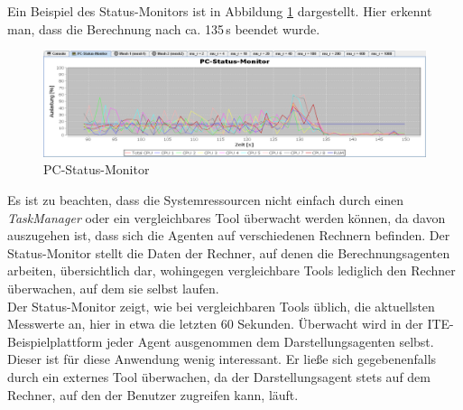 \documentclass[a4paper,12pt,oneside,openright,onecolumn,final,titlepage,fleqn,ngerman]{scrreprt}
\newcommand{\parag}{\\[2ex]}
\newcommand{\calcag}{Berechnungsagent}
\newcommand{\repag}{Darstellungsagent}
\begin{document}
	Ein Beispiel des Status-Monitors ist in Abbildung \ref{ss_statusmonitor} dargestellt. Hier erkennt man, dass die Berechnung nach ca. 135\,s beendet wurde.
	\begin{figure}[ht]
		\centering
		\includegraphics[keepaspectratio=true,width=\textwidth]{res/pcstatusmonitor.png}
		\caption{PC-Status-Monitor}
		\label{ss_statusmonitor}
	\end{figure}
	
	Es ist zu beachten, dass die Systemressourcen nicht einfach durch einen \emph{TaskManager} oder ein vergleichbares Tool überwacht werden können, da davon auszugehen ist, dass sich die Agenten auf verschiedenen Rechnern befinden. Der Status-Monitor stellt die Daten der Rechner, auf denen die \calcag{}en arbeiten, übersichtlich dar, wohingegen vergleichbare Tools lediglich den Rechner überwachen, auf dem sie selbst laufen.\parag{}
	Der Status-Monitor zeigt, wie bei vergleichbaren Tools üblich, die aktuellsten Messwerte an, hier in etwa die letzten 60 Sekunden. Überwacht wird in der ITE-Beispielplattform jeder Agent ausgenommen dem \repag{}en selbst. Dieser ist für diese Anwendung wenig interessant. Er ließe sich gegebenenfalls durch ein externes Tool überwachen, da der \repag{} stets auf dem Rechner, auf den der Benutzer zugreifen kann, läuft.
\end{document}
